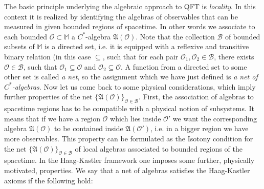\documentclass[12pt]{article}
\newcommand{\fA}{\mathfrak{A}}
\newcommand{\Ocal}{\mathcal{O}}
\newcommand{\M}{\mathbb{M}} 	     %
\newcommand{\1}{\mathds{1}}                         %
\begin{document}
The basic principle underlying the algebraic approach to QFT is \textit{locality}. In this context it is realized by identifying the algebras of observables that can be measured in given bounded regions of spacetime. In other words we associate to each bounded $\Ocal\subset \M$ a $C^*$-algebra $\fA(\Ocal)$.  Note that the collection $\mathcal{B}$ of bounded subsets of $\M$ is a directed set, i.e. it is equipped with a reflexive and transitive binary relation (in this case $\subseteq$, such that for each pair $\Ocal_1,\Ocal_2\in\mathcal{B}$, there exists $\Ocal\in\mathcal{B}$, such that $\Ocal_1\subseteq \Ocal$ and $\Ocal_2\subseteq \Ocal$. A function from a directed set to some other set is called \textit{a net}, so the assignment which we have just defined is \textit{a net of $C^*$-algebras}. Now let us come back to some physical considerations, which imply further properties of the net $\{\fA(\Ocal)\}_{\Ocal\in\mathcal{B}}$. First, the association of algebras to spacetime regions has to be compatible with a physical notion of subsystems. It means that if we have a region $\Ocal$ which lies inside $\Ocal'$ we want the corresponding algebra $\fA(\Ocal)$ to be contained inside $\fA(\Ocal')$, i.e. in a bigger region we have more observables. This property can be formulated as the Isotony condition for the net $\{\fA(\Ocal)\}_{\Ocal\in\mathcal{B}}$ of local algebras associated to bounded regions of the spacetime. In the Haag-Kastler framework one imposes some further, physically motivated, properties. We say that a net of algebras satisfies the Haag-Kastler axioms if the following hold:
\end{document}
